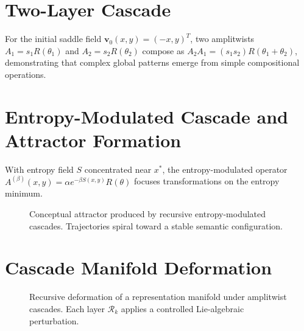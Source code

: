 \documentclass[12pt,a4paper,oneside]{book}
\numberwithin{equation}{chapter}
\theoremstyle{plain}
\theoremstyle{definition}
\theoremstyle{remark}
\begin{document}
\section{Two-Layer Cascade}

For the initial saddle field $\mathbf{v}_0(x,y) = (-x,y)^T$, two
amplitwists $A_1 = s_1 R(\theta_1)$ and $A_2 = s_2 R(\theta_2)$
compose as
$A_2 A_1 = (s_1 s_2) R(\theta_1+\theta_2)$,
demonstrating that complex global patterns emerge from simple
compositional operations.

\section{Entropy-Modulated Cascade and Attractor Formation}

With entropy field $S$ concentrated near $x^\ast$, the
entropy-modulated operator $A^{(\beta)}(x,y) = \alpha e^{-\beta
S(x,y)} R(\theta)$ focuses transformations on the entropy minimum.

\begin{figure}[htbp]
\centering
{}
\caption{Conceptual attractor produced by recursive entropy-modulated
cascades. Trajectories spiral toward a stable semantic configuration.}
\label{fig:cascade-attractor}
\end{figure}

\section{Cascade Manifold Deformation}

\begin{figure}[htbp]
\centering
{}
\caption{Recursive deformation of a representation manifold under
amplitwist cascades. Each layer $\mathcal{R}_k$ applies a controlled
Lie-algebraic perturbation.}
\label{fig:cascade-deformation}
\end{figure}
\end{document}
